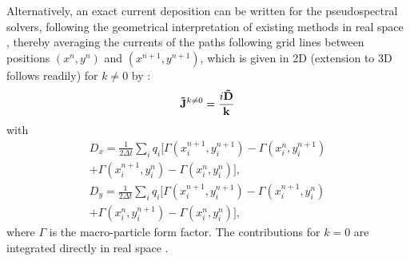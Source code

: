 Alternatively, an exact current deposition can be written for the pseudospectral solvers, following the geometrical interpretation of existing methods in real space \cite{Morsenielson1971,Villasenorcpc92,Esirkepovcpc01}, thereby averaging the currents of the paths following grid lines between positions $(x^n,y^n)$ and $(x^{n+1},y^{n+1})$, which is given in 2D (extension to 3D follows readily) for $k\neq0$ by  \cite{VayJCP2013}:
%
\begin{eqnarray}
\mathbf{\tilde{J}}^{k\neq0}=\frac{i\mathbf{\tilde{D}}}{\mathbf{k}}
\label{Eq_Jdep_1}
\end{eqnarray}
with 
\begin{eqnarray}
D_x   =  \frac{1}{2\Delta t}\sum_i q_i
  [\Gamma(x_i^{n+1},y_i^{n+1})-\Gamma(x_i^{n},y_i^{n+1}) \nonumber\\ 
+\Gamma(x_i^{n+1},y_i^{n})-\Gamma(x_i^{n},y_i^{n})],\\
D_y   =  \frac{1}{2\Delta t}\sum_i q_i
  [\Gamma(x_i^{n+1},y_i^{n+1})-\Gamma(x_i^{n+1},y_i^{n}) \nonumber \\
+\Gamma(x_i^{n},y_i^{n+1})-\Gamma(x_i^{n},y_i^{n})],
\end{eqnarray}
where $\Gamma$ is the macro-particle form factor. 
%
The contributions for $k=0$ are integrated directly in real space  \cite{VayJCP2013}.

